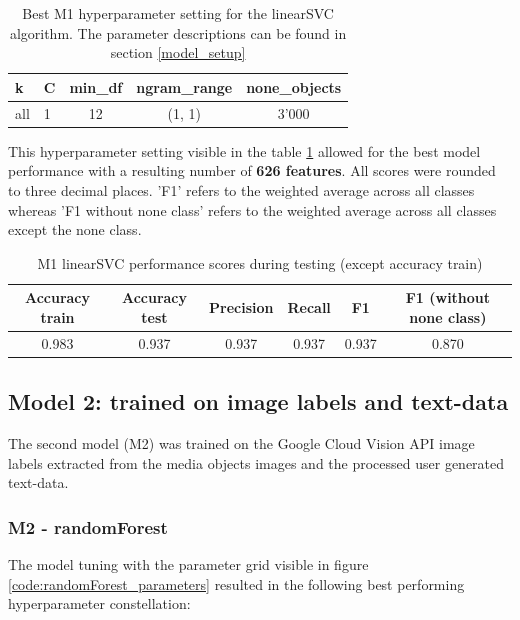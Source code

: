 \begin{table}[h!]
\begin{center}
\caption{Best M1 hyperparameter setting for the linearSVC algorithm. The parameter descriptions can be found in section \ref{model_setup}}\vspace{1ex}
\label{tab:m1_linearSVC_bestParams}
\begin{tabular}{llccc}\hline
k & C & min\_df & ngram\_range & none\_objects \\ \hline
all & 1 & 12 & (1, 1) & 3'000 \\ \hline
\end{tabular}
\end{center}
\end{table}

This hyperparameter setting visible in the table \ref{tab:m1_linearSVC_bestParams} allowed for the best model performance with a resulting number of \textbf{626 features}. All scores were rounded to three decimal places. 'F1' refers to the weighted average across all classes whereas 'F1 without none class' refers to the weighted average across all classes except the none class.

\begin{table}[h!]
\begin{center}
\caption{M1 linearSVC performance scores during testing (except accuracy train)}\vspace{1ex}
\label{tab:m1_linearSVC_bestscores}
\begin{tabular}{cccccc}\hline
Accuracy train & Accuracy test & Precision & Recall & F1 & F1 (without none class)\\ \hline
0.983 & 0.937 & 0.937 & 0.937 & 0.937 & 0.870 \\ \hline
\end{tabular}
\end{center}
\end{table}

\subsection{Model 2: trained on image labels and text-data}
The second model (M2) was trained on the Google Cloud Vision API image labels extracted from the media objects images and the processed user generated text-data.

\subsubsection{M2 - randomForest}
The model tuning with the parameter grid visible in figure \ref{code:randomForest_parameters} resulted in the following best performing hyperparameter constellation:\\

